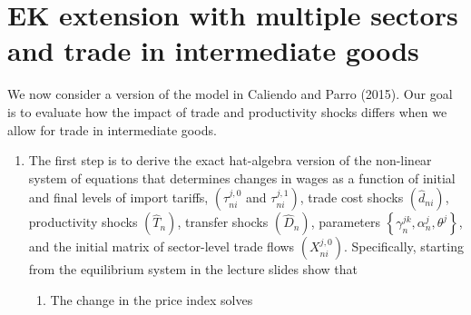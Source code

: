 \documentclass[12pt,oneside,reqno]{article}
\begin{document}
\section{EK extension with multiple sectors and trade in intermediate goods}

We now consider a version of the model in Caliendo and Parro (2015). Our goal is to evaluate how the impact of trade and productivity shocks differs when we allow for trade in intermediate goods.
\begin{enumerate}[label=\roman*., leftmargin=*]
    \item The first step is to derive the exact hat-algebra version of the non-linear system of equations that determines changes in wages as a function of initial and final levels of import tariffs, $\left(\tau_{n i}^{j, 0}\right.$ and $\left.\tau_{n i}^{j, 1}\right)$, trade cost shocks $\left(\hat{d}_{n i}\right)$, productivity shocks $\left(\hat{T}_{n}\right)$, transfer shocks $\left(\hat{D}_{n}\right)$, parameters $\left\{\gamma_{n}^{j k}, \alpha_{n}^{j}, \theta^{j}\right\}$, and the initial matrix of sector-level trade flows $\left(X_{n i}^{j, 0}\right)$. Specifically, starting from the equilibrium system in the lecture slides show that

\begin{enumerate}
    \item The change in the price index solves


\end{enumerate}
\end{enumerate}
\end{document}

